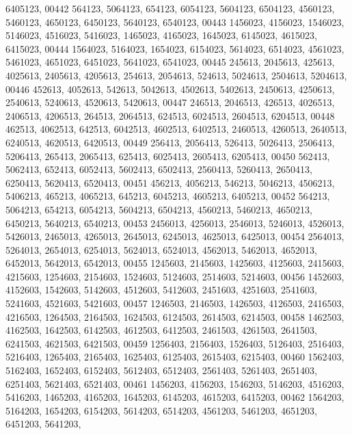 \begin{DoxyCode}
      6405123,
00442        564123, 5064123,  654123, 6054123, 5604123, 6504123, 4560123, 5460123, 4650123, 6450123, 5640123, 
      6540123,
00443       1456023, 4156023, 1546023, 5146023, 4516023, 5416023, 1465023, 4165023, 1645023, 6145023, 4615023, 
      6415023,
00444       1564023, 5164023, 1654023, 6154023, 5614023, 6514023, 4561023, 5461023, 4651023, 6451023, 5641023, 
      6541023,
00445        245613, 2045613,  425613, 4025613, 2405613, 4205613,  254613, 2054613,  524613, 5024613, 2504613, 
      5204613,
00446        452613, 4052613,  542613, 5042613, 4502613, 5402613, 2450613, 4250613, 2540613, 5240613, 4520613, 
      5420613,
00447        246513, 2046513,  426513, 4026513, 2406513, 4206513,  264513, 2064513,  624513, 6024513, 2604513, 
      6204513,
00448        462513, 4062513,  642513, 6042513, 4602513, 6402513, 2460513, 4260513, 2640513, 6240513, 4620513, 
      6420513,
00449        256413, 2056413,  526413, 5026413, 2506413, 5206413,  265413, 2065413,  625413, 6025413, 2605413, 
      6205413,
00450        562413, 5062413,  652413, 6052413, 5602413, 6502413, 2560413, 5260413, 2650413, 6250413, 5620413, 
      6520413,
00451        456213, 4056213,  546213, 5046213, 4506213, 5406213,  465213, 4065213,  645213, 6045213, 4605213, 
      6405213,
00452        564213, 5064213,  654213, 6054213, 5604213, 6504213, 4560213, 5460213, 4650213, 6450213, 5640213, 
      6540213,
00453       2456013, 4256013, 2546013, 5246013, 4526013, 5426013, 2465013, 4265013, 2645013, 6245013, 4625013, 
      6425013,
00454       2564013, 5264013, 2654013, 6254013, 5624013, 6524013, 4562013, 5462013, 4652013, 6452013, 5642013, 
      6542013,
00455       1245603, 2145603, 1425603, 4125603, 2415603, 4215603, 1254603, 2154603, 1524603, 5124603, 2514603, 
      5214603,
00456       1452603, 4152603, 1542603, 5142603, 4512603, 5412603, 2451603, 4251603, 2541603, 5241603, 4521603, 
      5421603,
00457       1246503, 2146503, 1426503, 4126503, 2416503, 4216503, 1264503, 2164503, 1624503, 6124503, 2614503, 
      6214503,
00458       1462503, 4162503, 1642503, 6142503, 4612503, 6412503, 2461503, 4261503, 2641503, 6241503, 4621503, 
      6421503,
00459       1256403, 2156403, 1526403, 5126403, 2516403, 5216403, 1265403, 2165403, 1625403, 6125403, 2615403, 
      6215403,
00460       1562403, 5162403, 1652403, 6152403, 5612403, 6512403, 2561403, 5261403, 2651403, 6251403, 5621403, 
      6521403,
00461       1456203, 4156203, 1546203, 5146203, 4516203, 5416203, 1465203, 4165203, 1645203, 6145203, 4615203, 
      6415203,
00462       1564203, 5164203, 1654203, 6154203, 5614203, 6514203, 4561203, 5461203, 4651203, 6451203, 5641203, 

\end{DoxyCode}

